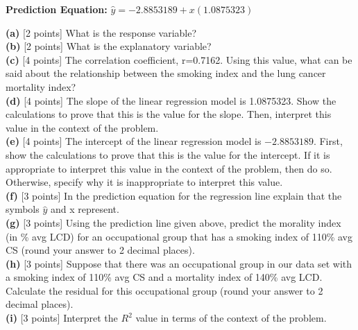 \documentclass[11pt]{isuthesis}\usepackage[]{graphicx}\usepackage[]{color}
\begin{document}
\begin{appendices}
\begin{center}
\textbf{Prediction Equation:} \hspace{.2in}  $\hat{y} = \ensuremath{-2.8853189} + x(1.0875323)$
\end{center}
\noindent\textbf{(a)} [2 points] What is the response variable?\\
\noindent\textbf{(b)} [2 points] What is the explanatory variable?\\
\noindent\textbf{(c)} [4 points] The correlation coefficient, r=0.7162.  Using this value, what can be said about the relationship between the smoking index and the lung cancer mortality index?\\
\noindent\textbf{(d)} [4 points] The slope of the linear regression model is 1.0875323. Show the calculations to prove that this is the value for the slope. Then, interpret this value in the context of the problem.\\
\noindent\textbf{(e)} [4 points] The intercept of the linear regression model is \ensuremath{-2.8853189}. First, show the calculations to prove that this is the value for the intercept. If it is appropriate to interpret this value in the context of the problem, then do so. Otherwise, specify why it is inappropriate to interpret this value.\\
\noindent\textbf{(f)} [3 points] In the prediction equation for the regression line explain that the symbols $\hat{y}$ and x represent.\\
\noindent\textbf{(g)} [3 points] Using the prediction line given above, predict the morality index (in \% avg LCD) for an occupational group that has a smoking index of 110\% avg CS (round your answer to 2 decimal places).\\
\noindent\textbf{(h)} [3 points] Suppose that there was an occupational group in our data set with a smoking index of 110\% avg CS and a mortality index of 140\% avg LCD.  Calculate the residual for this occupational group (round your answer to 2 decimal places).\\
\noindent\textbf{(i)} [3 points] Interpret the $R^2$ value in terms of the context of the problem.\\


\end{appendices}
\end{document}

